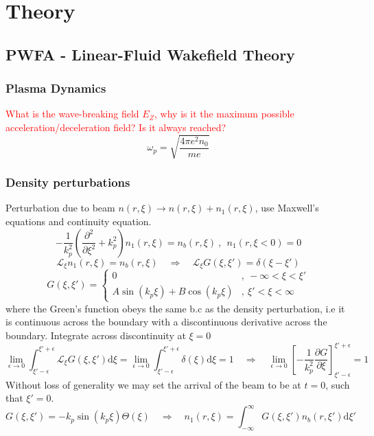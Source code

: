 \chapter{Theory}


\section{PWFA - Linear-Fluid Wakefield Theory}
\subsection{Plasma Dynamics}
\textcolor{red}{What is the wave-breaking field $E_Z$, why is it the maximum possible acceleration/deceleration field? Is it always reached?}
\begin{equation}
\omega_p=\sqrt{\frac{4\pi e^2n_0}{me}}
\end{equation}
\subsection{Density perturbations}
Perturbation due to beam $n\left(r,\xi \right)\to n\left(r,\xi \right)+n_1\left(r,\xi \right)$, use Maxwell's equations and continuity equation.
\begin{equation}
-\frac{1}{k_p^2}\left(\frac{\partial^2 }{\partial \xi^2}+k_p^2\right)n_1\left(r,\xi \right)=n_b\left(r,\xi \right) ~,~~n_1\left(r,\xi<0 \right)=0
\end{equation}
\begin{equation}
\mathcal{L}_{\xi}n_1\left(r,\xi \right)=n_b\left(r,\xi \right) \quad \Rightarrow \quad \mathcal{L}_{\xi}G\left(\xi,\xi'\right)=\delta\left(\xi-\xi'\right)
\end{equation}
\begin{equation}
G\left(\xi,\xi'\right)=\left\{ \begin{array}{ll}
0 &,~ -\infty<\xi<\xi'\\
A\sin\left(k_p\xi \right) + B\cos\left(k_p\xi \right) &,~ \xi'<\xi<\infty
\end{array}\right.
\end{equation}
where the Green's function obeys the same b.c as the density perturbation, i.e it is continuous across the boundary with a discontinuous derivative across the boundary.
Integrate across discontinuity at $\xi=0$
\begin{equation}
\lim_{\epsilon\to 0}\int_{\xi'-\epsilon}^{\xi'+\epsilon} \mathcal{L}_{\xi}G\left(\xi,\xi'\right)\mathrm{d}\xi=\lim_{\epsilon\to 0}\int_{\xi'-\epsilon}^{\xi'+\epsilon}\delta\left(\xi\right)\mathrm{d}\xi=1 \quad \Rightarrow \quad \lim_{\epsilon\to 0}\left[-\frac{1}{k_p^2}\frac{\partial G}{\partial \xi}\right]^{\xi'+\epsilon}_{\xi'-\epsilon}=1
\end{equation}
Without loss of generality we may set the arrival of the beam to be at $t=0$, such that $\xi'=0$.
\begin{equation}
G\left(\xi,\xi'\right)=-k_p\sin\left(k_p\xi \right)\Theta\left(\xi \right) \quad \Rightarrow \quad n_1\left(r,\xi \right)=\int_{-\infty}^{\infty}G\left(\xi,\xi'\right)n_b\left(r,\xi' \right) \mathrm{d}\xi'
\end{equation}
